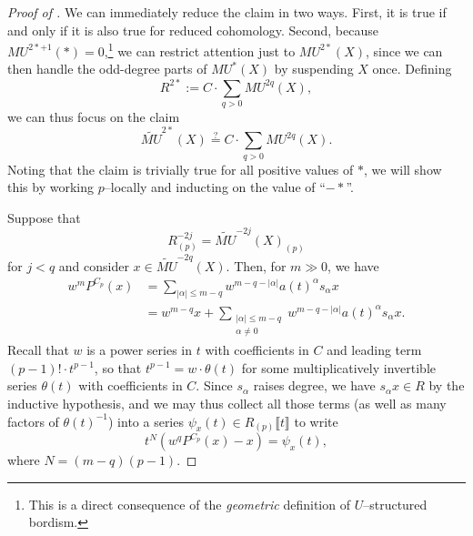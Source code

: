 \begin{proof}[{Proof of }]
We can immediately reduce the claim in two ways.  First, it is true if and only if it is also true for reduced cohomology.  Second, because \(MU^{2*+1}(*) = 0\),\footnote{This is a direct consequence of the \emph{geometric} definition of \(U\)--structured bordism.} we can restrict attention just to \(MU^{2*}(X)\), since we can then handle the odd-degree parts of \(MU^*(X)\) by suspending \(X\) once.  Defining \[R^{2*} := C \cdot \sum_{q > 0} MU^{2q}(X),\] we can thus focus on the claim \[\widetilde{MU}^{2*}(X) \stackrel{?}{=} C \cdot \sum_{q > 0} MU^{2q}(X).\]  Noting that the claim is trivially true for all positive values of \(*\), we will show this by working \(p\)--locally and inducting on the value of ``\(-*\)''.

Suppose that \[R^{-2j}_{(p)} = \widetilde{MU}^{-2j}(X)_{(p)}\] for \(j < q\) and consider \(x \in \widetilde{MU}^{-2q}(X)\).  Then, for \(m \gg 0\), we have
\begin{align*}
w^m P^{C_p}(x) & = \sum_{|\alpha| \le m-q} w^{m-q - |\alpha|} a(t)^\alpha s_\alpha x \\
& = w^{m-q} x + \sum_{\substack{|\alpha| \le m-q \\ \alpha \ne 0}} w^{m-q - |\alpha|} a(t)^\alpha s_\alpha x.
\end{align*}
Recall that \(w\) is a power series in \(t\) with coefficients in \(C\) and leading term \((p-1)! \cdot t^{p-1}\), so that \(t^{p-1} = w \cdot \theta(t)\) for some multiplicatively invertible series \(\theta(t)\) with coefficients in \(C\).  Since \(s_\alpha\) raises degree, we have \(s_\alpha x \in R\) by the inductive hypothesis, and we may thus collect all those terms (as well as many factors of \(\theta(t)^{-1}\)) into a series \(\psi_x(t) \in R_{(p)}\llbracket t \rrbracket\) to write \[t^N(w^q P^{C_p}(x) - x) = \psi_x(t),\] where \(N = (m-q)(p-1)\).


\end{proof}
